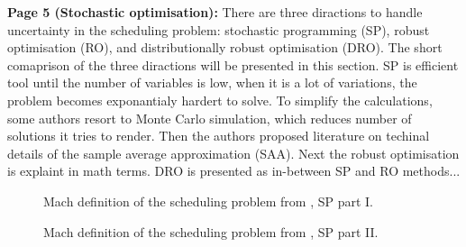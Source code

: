     \textbf{Page 5 (Stochastic optimisation):}
    There are three diractions to handle uncertainty in the scheduling problem: stochastic programming (SP), robust optimisation (RO), and distributionally robust optimisation (DRO). The short comaprison of the three diractions will be presented in this section. SP is efficient tool until the number of variables is low, when it is a lot of variations, the problem becomes exponantialy hardert to solve. To simplify the calculations, some authors resort to Monte Carlo simulation, which reduces number of solutions it tries to render. Then the authors proposed literature on techinal details of the sample average approximation (SAA). Next the robust optimisation is explaint in math terms. DRO is presented as in-between SP and RO methods...  
    \begin{figure}[H]
        \centering
        \caption{Mach definition of the scheduling problem from \cite{x335}, SP part I.}
        \label{fig4:SR0015US22}
    \end{figure}
    \begin{figure}[H]
        \centering
        \caption{Mach definition of the scheduling problem from \cite{x335}, SP part II.}
        \label{fig5:SR0015US22}
    \end{figure}
